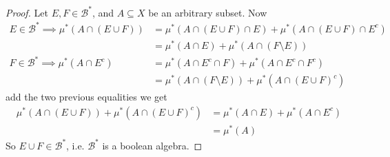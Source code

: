 \documentclass[a4paper]{article}
\begin{document}
\begin{thm}
\begin{proof}
Let $E,F \in \mathcal{B}^*$, and $A \subseteq X$ be an arbitrary subset. Now
\begin{equation*}
\begin{aligned}
E \in \mathcal{B}^* \implies \mu^*(A\cap(E\cup F)) &= \mu^*(A\cap(E \cup F) \cap E) + \mu^*(A \cap (E \cup F) \cap E^c)\\
&= \mu^*(A \cap E) + \mu^*(A \cap(F \setminus E))\\
F \in \mathcal{B}^* \implies \mu^*(A \cap E^c) &= \mu^*(A \cap E^c \cap F) + \mu^*(A \cap E^c \cap F^c)\\
&= \mu^*(A \cap (F \setminus E)) + \mu^*(A \cap (E \cup F)^c)
\end{aligned}
\end{equation*}
add the two previous equalities we get
\begin{equation*}
\begin{aligned}
\mu^*(A \cap (E \cup F)) + \mu^*(A \cap (E \cup F)^c) &= \mu^*(A \cap E)+\mu^*(A \cap E^c)\\
&=\mu^* (A)
\end{aligned}
\end{equation*}
So $E \cup F \in \mathcal{B}^*$, i.e. $\mathcal{B}^*$ is a boolean algebra.


\end{proof}
\end{thm}
\end{document}
